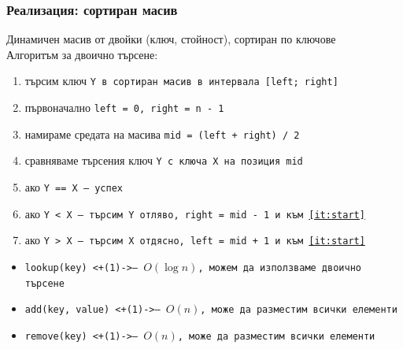 \documentclass{beamer}
\begin{document}
\begin{frame}
  \frametitle{Реализация: сортиран масив}
  Динамичен масив от двойки (ключ, стойност), сортиран по ключове\\
  \pause
  Алгоритъм за двоично търсене:
  \begin{enumerate}
  \item търсим ключ \tt Y в сортиран масив в интервала \tt{[left; right]}
  \item първоначално \tt{left = 0}, \tt{right = n - 1}
  \item\label{it:start}  намираме средата на масива \tt{mid = (left + right) / 2}
  \item сравняваме търсения ключ \tt Y с ключа \tt X на позиция mid
  \item ако \tt{Y == X} --- успех
  \item ако \tt{Y < X} --- търсим \tt Y отляво, \tt{right = mid - 1} и към \ref{it:start}
  \item ако \tt{Y > X} --- търсим \tt X отдясно, \tt{left = mid + 1} и към \ref{it:start}
  \end{enumerate}
  \pause
  \begin{itemize}
  \item \tt{lookup(key)} \onslide<+(1)->{--- $O(\log n)$, можем да използваме двоично търсене}
  \item \tt{add(key, value)} \onslide<+(1)->{--- $O(n)$, може да разместим всички елементи}
  \item \tt{remove(key)} \onslide<+(1)->{--- $O(n)$, може да разместим всички елементи}
  \end{itemize}
\end{frame}
\end{document}

